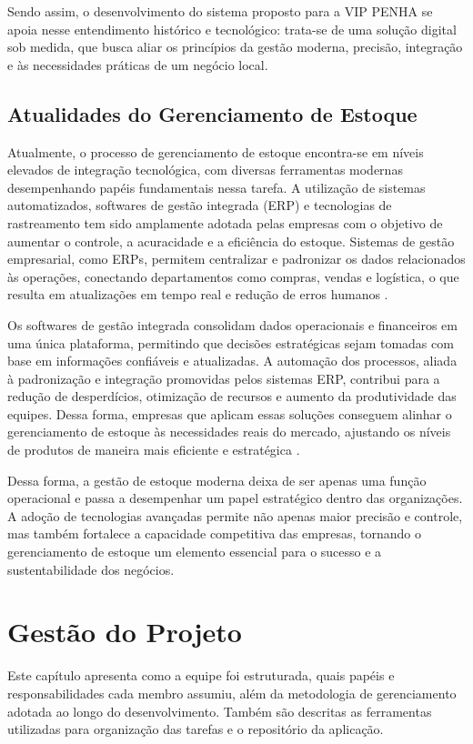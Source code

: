\documentclass[
	12pt,				%
	openany,			%
	twoside,			%
	a4paper,			%
	english,			%
	brazil				%
	]{abntex2}
\begin{document}
Sendo assim, o desenvolvimento do sistema proposto para a VIP PENHA se apoia nesse entendimento histórico e tecnológico: trata-se de uma solução digital sob medida, que busca aliar os princípios da gestão moderna, precisão, integração e às necessidades práticas de um negócio local. 

\section{Atualidades do Gerenciamento de Estoque}
Atualmente, o processo de gerenciamento de estoque encontra-se em níveis elevados de integração tecnológica, com diversas ferramentas modernas desempenhando papéis fundamentais nessa tarefa. A utilização de sistemas automatizados, softwares de gestão integrada (ERP) e tecnologias de rastreamento tem sido amplamente adotada pelas empresas com o objetivo de aumentar o controle, a acuracidade e a eficiência do estoque. Sistemas de gestão empresarial, como ERPs, permitem centralizar e padronizar os dados relacionados às operações, conectando departamentos como compras, vendas e logística, o que resulta em atualizações em tempo real e redução de erros humanos \cite{cast4it2024}.

Os softwares de gestão integrada consolidam dados operacionais e financeiros em uma única plataforma, permitindo que decisões estratégicas sejam tomadas com base em informações confiáveis e atualizadas. A automação dos processos, aliada à padronização e integração promovidas pelos sistemas ERP, contribui para a redução de desperdícios, otimização de recursos e aumento da produtividade das equipes. Dessa forma, empresas que aplicam essas soluções conseguem alinhar o gerenciamento de estoque às necessidades reais do mercado, ajustando os níveis de produtos de maneira mais eficiente e estratégica \cite{silva2020}.

Dessa forma, a gestão de estoque moderna deixa de ser apenas uma função operacional e passa a desempenhar um papel estratégico dentro das organizações. A adoção de tecnologias avançadas permite não apenas maior precisão e controle, mas também fortalece a capacidade competitiva das empresas, tornando o gerenciamento de estoque um elemento essencial para o sucesso e a sustentabilidade dos negócios.


\chapter{Gestão do Projeto}

Este capítulo apresenta como a equipe foi estruturada, quais papéis e responsabilidades cada membro assumiu, além da metodologia de gerenciamento adotada ao longo do desenvolvimento. Também são descritas as ferramentas utilizadas para organização das tarefas e o repositório da aplicação.
\end{document}
